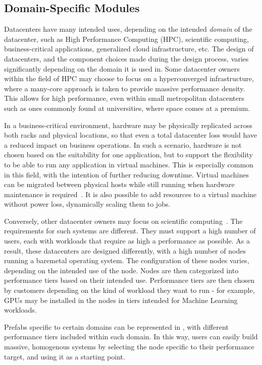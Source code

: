 \documentclass[11pt]{article}
\begin{document}
	\subsection{Domain-Specific Modules}
		Datacenters have many intended uses, depending on the intended \textit{domain} of the datacenter, such as High Performance Computing (HPC), scientific computing, business-critical applications, generalized cloud infrastructure, etc.
		The design of datacenters, and the component choices made during the design process, varies significantly depending on the domain it is used in.
		Some datacenter owners within the field of HPC may choose to focus on a hyperconverged infrastructure, where a many-core approach is taken to provide massive performance density.
		This allows for high performance, even within small metropolitan datacenters such as ones commonly found at universities, where space comes at a premium.

		In a business-critical environment, hardware may be physically replicated across both racks and physical locations, so that even a total datacenter loss would have a reduced impact on business operations.
		In such a scenario, hardware is not chosen based on the suitability for one application, but to support the flexibility to be able to run any application in virtual machines.
		This is especially common in this field, with the intention of further reducing downtime.
		Virtual machines can be migrated between physical hosts while still running when hardware maintenance is required~\cite{Elsaid2016}.
		It is also possible to add resources to a virtual machine without power loss, dynamically scaling them to jobs.

		Conversely, other datacenter owners may focus on scientific computing~\cite{SURF2020}.
		The requirements for such systems are different.
		They must support a high number of users, each with workloads that require as high a performance as possible.
		As a result, these datacenters are designed differently, with a high number of nodes running a baremetal operating system.
		The configuration of these nodes varies, depending on the intended use of the node.
		Nodes are then categorized into performance tiers based on their intended use.
		Performance tiers are then chosen by customers depending on the kind of workload they want to run - for example, GPUs may be installed in the nodes in tiers intended for Machine Learning workloads.

		Prefabs specific to certain domains can be represented in \opendc{}, with different performance tiers included within each domain.
		In this way, users can easily build massive, homogenous systems by selecting the node specific to their performance target, and using it as a starting point.
\end{document}

